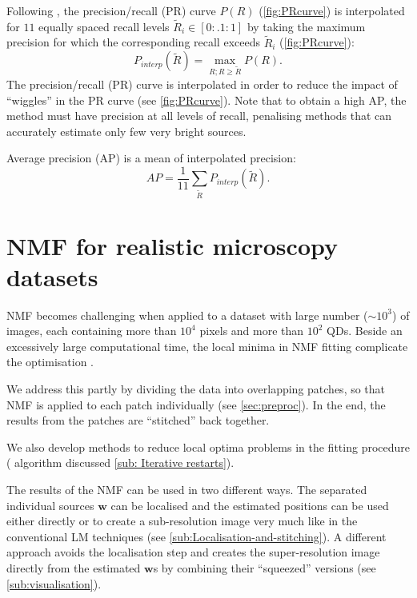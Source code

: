 Following \cite{Everingham2009}, the precision/recall (PR) curve $P(R)$ (\autoref{fig:PRcurve}\aaa) is interpolated for $11$ equally spaced recall levels $\tilde{R}_{i}\in[0:.1:1]$ by taking the maximum precision for which the corresponding recall exceeds $\tilde{R}_{i}$ (\autoref{fig:PRcurve}\bbb):
%
\begin{equation}
	P_{interp}(\tilde{R})=\max_{R;R\geq \tilde{R}}P(R).
\end{equation}
%
The precision/recall (PR) curve is interpolated in order to reduce the impact of ``wiggles'' in the PR curve (see \autoref{fig:PRcurve}\bbb). Note that to obtain a high AP, the method must have precision at all levels of recall, penalising methods that can accurately estimate only few very bright sources. 

Average precision (AP) is a mean of interpolated precision:
%
\begin{equation}
	AP=\frac{1}{11}\sum_{\tilde{R}}{P_{interp}(\tilde{R})}.
	\label{eq:AP}
\end{equation}


\clearpage
\section{NMF for realistic microscopy datasets \label{sec:NMF-for-real}}

NMF becomes challenging when applied to a dataset with large number ($\sim 10^3$) of images, each containing more than $10^4$ pixels and more than $10^2$ QDs. Beside an excessively large computational time, the local minima in NMF fitting complicate the optimisation \cite{Kim2008}. 

We address this partly by dividing the data into overlapping patches, so that NMF is applied to each patch individually (see \autoref{sec:preproc}).  In the end, the results from the patches are ``stitched'' back together. 

We also develop methods to reduce local optima problems in the fitting procedure (\inmf{} algorithm discussed \autoref{sub: Iterative restarts}). 

The results of the NMF can be used in two different ways. The separated individual sources $\bm{w}$ can be localised and the estimated positions can be used either directly or to create a sub-resolution image very much like in the conventional LM techniques (see \autoref{sub:Localisation-and-stitching}). A different approach avoids the localisation step and creates the super-resolution image directly from the estimated $\bm{w}$s by combining their ``squeezed'' versions (see \autoref{sub:visualisation}). 

